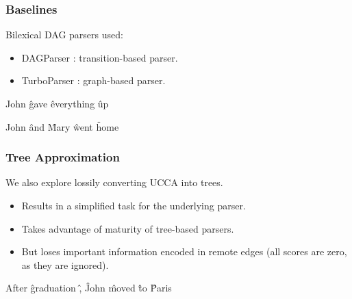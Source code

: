 \documentclass[t]{beamer}
\begin{document}
\begin{frame}
\frametitle{Baselines}
Bilexical DAG parsers used:
\begin{itemize}
 \item DAGParser \cite{ribeyre-villemontedelaclergerie-seddah:2014:SemEval}:
 transition-based parser.
 \item TurboParser \cite{almeida-martins:2015:SemEval}:
 graph-based parser.
\end{itemize}

\vfill
\pause
\begin{center}
	\begin{dependency}[theme = simple]
	\begin{deptext}[column sep=.7em,ampersand replacement=\^,font=\rmfamily]
	John \^ gave \^ everything \^ up \\
	\end{deptext}
	\end{dependency}
	
	\begin{dependency}[theme = simple]
	\begin{deptext}[column sep=.7em,ampersand replacement=\^,font=\rmfamily]
	John \^ and \^ Mary \^ went \^ home \\
	\end{deptext}
	\end{dependency}
\end{center}
\end{frame}


\begin{frame}
\frametitle{Tree Approximation}
We also explore lossily converting UCCA into trees.
\begin{itemize}
 \item Results in a simplified task for the underlying parser.
 \item Takes advantage of maturity of tree-based parsers.
 \item But loses important information encoded in remote edges
   (all scores are zero, as they are ignored).
\end{itemize}

\vfill
\begin{center}
	\begin{dependency}[theme = simple]
	\begin{deptext}[column sep=.7em,ampersand replacement=\^,font=\rmfamily]
	After \^ graduation \^ , \^ John \^ moved \^ to \^ Paris \\
	\end{deptext}
	\end{dependency}
\end{center}
\end{frame}
\end{document}
